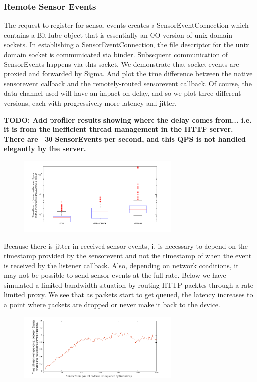 \documentclass[prodmode]{acmlarge}
\begin{document}
\subsubsection{Remote Sensor Events}
The request to register for sensor events creates a SensorEventConnection which contains a BitTube object that is essentially an OO version of unix domain sockets. In establishing a SensorEventConnection, the file descriptor for the unix domain socket is communicated via binder. Subsequent communication of SensorEvents happens via this socket. We demonstrate that socket events are proxied and forwarded by Sigma. And plot the time difference between the native sensorevent callback and the remotely-routed sensorevent callback. Of course, the data channel used will have an impact on delay, and so we plot three different versions, each with progressively more latency and jitter.

\textbf{TODO: Add profiler results showing where the delay comes from... i.e. it is from the inefficient thread management in the HTTP server. There are ~30 SensorEvents per second, and this QPS is not handled elegantly by the server.}

\begin{figure}[h]
\centering
\includegraphics[width=0.7\textwidth]{plots/sensorevent_delay.png}
\end{figure}

Because there is jitter in received sensor events, it is necessary to depend on the timestamp provided by the sensorevent and not the timestamp of when the event is received by the listener callback. Also, depending on network conditions, it may not be possible to send sensor events at the full rate. Below we have simulated a limited bandwidth situation by routing HTTP packtes through a rate limited proxy. We see that as packets start to get queued, the latency increases to a point where packets are dropped or never make it back to the device.

\begin{figure}[h]
\centering
\includegraphics[width=0.7\textwidth]{plots/limited_bandwidth_increasing_latency.png}
\end{figure}
\end{document}
